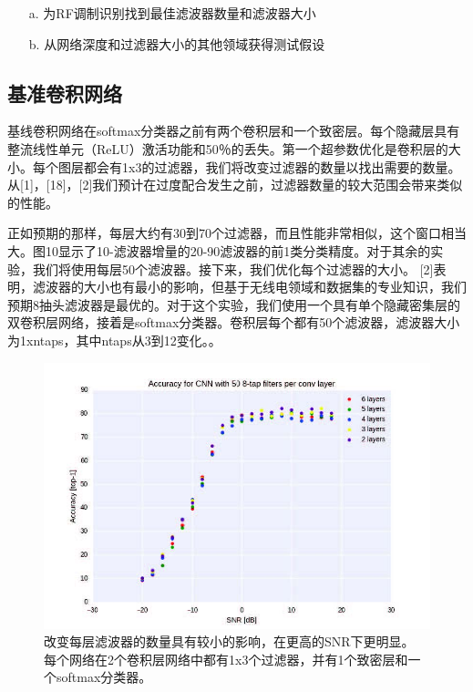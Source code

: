 \begin{enumerate}
	\item[a.] 为RF调制识别找到最佳滤波器数量和滤波器大小
	\item[b.] 从网络深度和过滤器大小的其他领域获得测试假设
\end{enumerate}

\subsection{基准卷积网络}

基线卷积网络在softmax分类器之前有两个卷积层和一个致密层。每个隐藏层具有整流线性单元（ReLU）激活功能和50％的丢失。第一个超参数优化是卷积层的大小。每个图层都会有1x3的过滤器，我们将改变过滤器的数量以找出需要的数量。从[1]，[18]，[2]我们预计在过度配合发生之前，过滤器数量的较大范围会带来类似的性能。\par

正如预期的那样，每层大约有30到70个过滤器，而且性能非常相似，这个窗口相当大。图10显示了10-滤波器增量的20-90滤波器的前1类分类精度。对于其余的实验，我们将使用每层50个滤波器。接下来，我们优化每个过滤器的大小。 [2]表明，滤波器的大小也有最小的影响，但基于无线电领域和数据集的专业知识，我们预期8抽头滤波器是最优的。对于这个实验，我们使用一个具有单个隐藏密集层的双卷积层网络，接着是softmax分类器。卷积层每个都有50个滤波器，滤波器大小为1xntaps，其中ntaps从3到12变化。。\par

\begin{figure}[!h]
	\centering
	\includegraphics[scale=1]{figures/chapter_5/fig3}
	\caption{改变每层滤波器的数量具有较小的影响，在更高的SNR下更明显。
		每个网络在2个卷积层网络中都有1x3个过滤器，并有1个致密层和一个softmax分类器。}
\end{figure}

